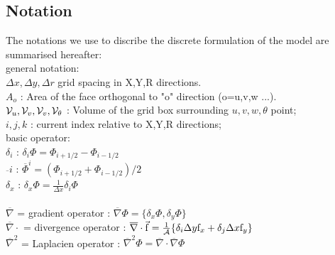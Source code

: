 
\subsection{Notation} 

The notations we use to discribe the discrete formulation 
of the model are summarised hereafter:\\
general notation:
\\ $\Delta x, \Delta y, \Delta r$ grid spacing in X,Y,R directions.
\\ $A_o$ : Area of the face orthogonal to "o" direction (o=u,v,w ...).
\\ ${\cal V}_u , {\cal V}_v , {\cal V}_v , {\cal V}_\theta$ :
Volume of the grid box surrounding $u,v,w,\theta$ point;
\\ $i,j,k$ : current index relative to X,Y,R directions;
\\basic operator:
\\ $\delta_i $ : $\delta_i \Phi = \Phi_{i+1/2} - \Phi_{i-1/2} $
\\ $\overline{~}i$ : $\overline{\Phi}^i = ( \Phi_{i+1/2} + \Phi_{i-1/2} ) / 2 $ 
\\ $\delta_x $ : $\delta_x \Phi = \frac{1}{\Delta x} \delta_i \Phi $
\\
\\ $\overline{\nabla}$ = gradient operator :  
$\overline{\nabla} \Phi = \{ \delta_x \Phi , \delta_y \Phi \}$
\\ $\overline{\nabla} \cdot$ = divergence operator :  
$\overline{\nabla}\cdot \vec{\mathrm{f}}  = 
\frac{1}{\cal A} \{ \delta_i \Delta y \mathrm{f}_x 
                  + \delta_j \Delta x \mathrm{f}_y \} $
\\ $\overline{\nabla}^2 $ = Laplacien operator :
$ \overline{\nabla}^2 \Phi = 
   \overline{\nabla}\cdot \overline{\nabla}\Phi $
